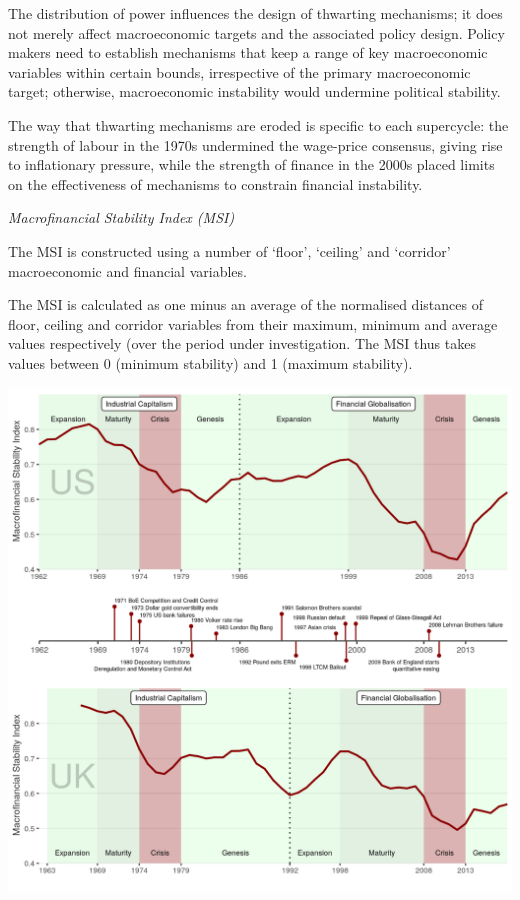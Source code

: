 \documentclass[
]{book}
\begin{document}
The distribution of power influences the
design of thwarting mechanisms; it does not merely affect macroeconomic targets and the associated
policy design. Policy makers need to establish mechanisms that keep a range of key macroeconomic
variables within certain bounds, irrespective of the primary macroeconomic target; otherwise,
macroeconomic instability would undermine political stability.

The way that thwarting mechanisms are eroded is specific to each supercycle:
the strength of labour in the 1970s undermined the wage-price consensus,
giving rise to inflationary pressure,
while the strength of finance in the 2000s placed limits on
the effectiveness of mechanisms to constrain financial instability.

\emph{Macrofinancial Stability Index (MSI)}

The MSI is constructed using a number of `floor', `ceiling' and `corridor'
macroeconomic and financial variables.

The MSI is calculated as one minus
an average of the normalised distances of floor, ceiling and corridor
variables from their maximum, minimum and average values respectively (over the period under
investigation.
The MSI thus takes values between 0 (minimum stability) and 1 (maximum stability).

\includegraphics{fig/msi.png}
\end{document}
